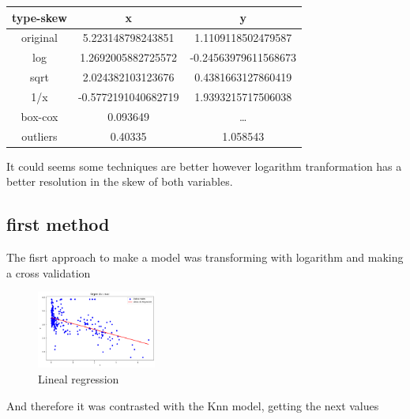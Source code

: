 \documentclass{article}
\begin{document}
\begin{center}
  \begin{tabular}{|c|c|c|}
    \hline
     type-skew & x & y  \\ \hline
     original& 5.223148798243851&1.1109118502479587\\
     log&1.2692005882725572&-0.24563979611568673\\
     sqrt&2.024382103123676&0.4381663127860419\\
     1/x&-0.5772191040682719&1.9393215717506038\\
     box-cox&0.093649&\dots\\
     outliers&0.40335&1.058543\\
      \hline
  \end{tabular}
\end{center}
It could seems some techniques are better however logarithm tranformation has a better resolution in the skew of both variables.    
\subsection{first method}
The fisrt approach to make a model was transforming with logarithm and making a cross validation
\begin{figure}[h]
  \centering
  \includegraphics[width=0.35\textwidth]{model_1.png}
  \caption{Lineal regression}
  \label{fig:example_1}
\end{figure}
And therefore it was contrasted with the Knn model, getting the next values
\end{document}
